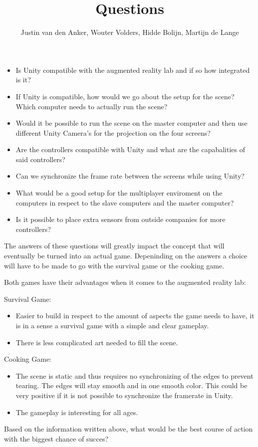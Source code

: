 \documentclass[10pt,a4paper]{article}
\author{Justin van den Anker, Wouter Volders, Hidde Bolijn, Martijn de Lange}
\title{Questions}
\begin{document}
\maketitle

\begin{itemize}
\item Is Unity compatible with the augmented reality lab and if so how integrated is it?
\item If Unity is compatible, how would we go about the setup for the scene? Which computer needs to actually run the scene?
\item Would it be possible to run the scene on the master computer and then use different Unity Camera's for the projection on the four screens?
\item Are the controllers compatible with Unity and what are the capabalities of said controllers?
\item Can we synchronize the frame rate between the screens while using Unity?
\item What would be a good setup for the multiplayer enviroment on the computers in respect to the slave computers and the master computer?
\item Is it possible to place extra sensors from outside companies for more controllers?

\end{itemize}
The answers of these questions will greatly impact the concept that will eventually be turned into an actual game. Depeninding on the answers a choice will have to be made to go with the survival game or the cooking game.

Both games have their advantages when it comes to the augmented reality lab:

Survival Game:
\begin{itemize}
\item Easier to build in respect to the amount of aspects the game needs to have, it is in a sense a survival game with a simple and clear gameplay.
\item There is less complicated art needed to fill the scene.
\end{itemize}

Cooking Game:
\begin{itemize}
\item The scene is static and thus requires no synchronizing of the edges to prevent tearing. The edges will stay smooth and in one smooth color. This could be very positive if it is not possible to synchronize the framerate in Unity.
\item The gameplay is interesting for all ages.
\end{itemize}

Based on the information written above, what would be the best course of action with the biggest chance of succes?
\end{document}
